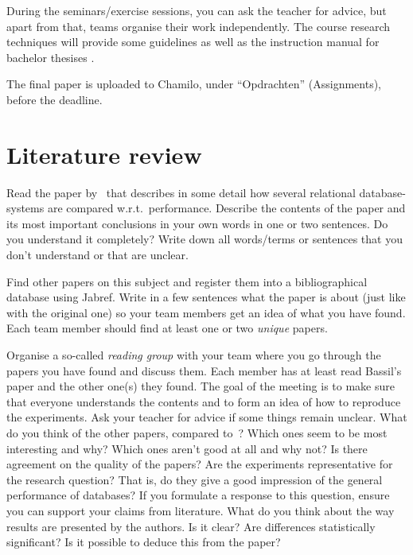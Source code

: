 \documentclass[fleqn,10pt]{artikeltin}
\begin{document}
During the seminars/exercise sessions, you can ask the teacher for advice, but apart from that, teams organise their work independently. The course research techniques will provide some guidelines as well as the instruction manual for bachelor thesises \autocite{VanVreckem2017}.

The final paper is uploaded to Chamilo, under ``Opdrachten'' (Assignments), before the deadline.


\section{Literature review}
\label{sec:literature-review}

Read the paper by~\textcite{Bassil2012} that describes in some detail how several relational database-systems are compared w.r.t.~performance. Describe the contents of the paper and its most important conclusions in your own words in one or two sentences. Do you understand it completely? Write down all words/terms or sentences that you don't understand or that are unclear.

Find other papers on this subject and register them into a bibliographical database using Jabref. Write in a few sentences what the paper is about (just like with the original one) so your team members get an idea of what you have found. Each team member should find at least one or two \emph{unique} papers.

Organise a so-called \emph{reading group} with your team where you go through the papers you have found and discuss them. Each member has at least read Bassil's paper and the other one(s) they found. The goal of the meeting is to make sure that everyone understands the contents and to form an idea of how to reproduce the experiments. Ask your teacher for advice if some things remain unclear. What do you think of the other papers, compared to~\textcite{Bassil2012}? Which ones seem to be most interesting and why? Which ones aren't good at all and why not? Is there agreement on the quality of the papers? Are the experiments representative for the research question? That is, do they give a good impression of the general performance of databases? If you formulate a response to this question, ensure you can support your claims from literature. What do you think about the way results are presented by the authors. Is it clear? Are differences statistically significant? Is it possible to deduce this from the paper?
\end{document}
